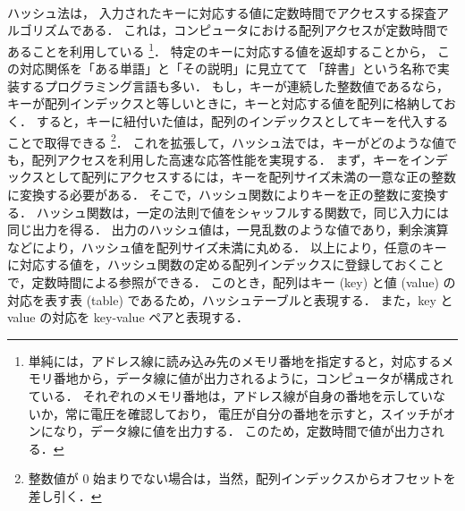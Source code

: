 \thispagestyle{empty} %

　\\
\\
\\
\\
\\
\\
\\
\\

ハッシュ法は，
入力されたキーに対応する値に定数時間でアクセスする探査アルゴリズムである．
これは，コンピュータにおける配列アクセスが定数時間であることを利用している
\footnote{
単純には，アドレス線に読み込み先のメモリ番地を指定すると，対応するメモリ番地から，データ線に値が出力されるように，コンピュータが構成されている．
それぞれのメモリ番地は，アドレス線が自身の番地を示していないか，常に電圧を確認しており，
電圧が自分の番地を示すと，スイッチがオンになり，データ線に値を出力する．
このため，定数時間で値が出力される．
}．
特定のキーに対応する値を返却することから，
この対応関係を「ある単語」と「その説明」に見立てて
「辞書」という名称で実装するプログラミング言語も多い．
もし，キーが連続した整数値であるなら，
キーが配列インデックスと等しいときに，キーと対応する値を配列に格納しておく．
すると，キーに紐付いた値は，配列のインデックスとしてキーを代入することで取得できる
\footnote{
整数値が 0 始まりでない場合は，当然，配列インデックスからオフセットを差し引く．
}．
これを拡張して，ハッシュ法では，キーがどのような値でも，配列アクセスを利用した高速な応答性能を実現する．
まず，キーをインデックスとして配列にアクセスするには，キーを配列サイズ未満の一意な正の整数に変換する必要がある．
そこで，ハッシュ関数によりキーを正の整数に変換する．
ハッシュ関数は，一定の法則で値をシャッフルする関数で，同じ入力には同じ出力を得る．
出力のハッシュ値は，一見乱数のような値であり，剰余演算などにより，ハッシュ値を配列サイズ未満に丸める．
以上により，任意のキーに対応する値を，ハッシュ関数の定める配列インデックスに登録しておくことで，定数時間による参照ができる．
このとき，配列はキー (key) と値 (value) の対応を表す表 (table) であるため，ハッシュテーブルと表現する．
また，key と value の対応を key-value ペアと表現する．

